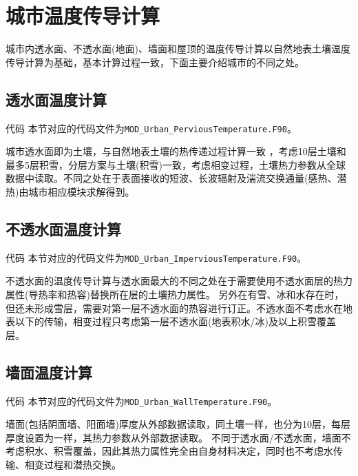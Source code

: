 \section{城市温度传导计算}
城市内透水面、不透水面(地面)、墙面和屋顶的温度传导计算以自然地表土壤温度传导计算为基础，基本计算过程一致，下面主要介绍城市的不同之处。

\subsection{透水面温度计算}
\begin{mymdframed}{代码}
  本节对应的代码文件为\texttt{MOD\_Urban\_PerviousTemperature.F90}。
\end{mymdframed}

城市透水面即为土壤，与自然地表土壤的热传递过程计算一致 ，考虑10层土壤和最多5层积雪，分层方案与土壤(积雪)一致，考虑相变过程，土壤热力参数从全球数据中读取。不同之处在于表面接收的短波、长波辐射及湍流交换通量(感热、潜热)由城市相应模块求解得到。

\subsection{不透水面温度计算}
\begin{mymdframed}{代码}
  本节对应的代码文件为\texttt{MOD\_Urban\_ImperviousTemperature.F90}。
\end{mymdframed}

不透水面的温度传导计算与透水面最大的不同之处在于需要使用不透水面层的热力属性(导热率和热容)替换所在层的土壤热力属性。
另外在有雪、冰和水存在时，但还未形成雪层，需要对第一层不透水面的热容进行订正。不透水面不考虑水在地表以下的传输，相变过程只考虑第一层不透水面(地表积水/冰)及以上积雪覆盖层。

\subsection{墙面温度计算}

\begin{mymdframed}{代码}
  本节对应的代码文件为\texttt{MOD\_Urban\_WallTemperature.F90}。
\end{mymdframed}

墙面(包括阴面墙、阳面墙)厚度从外部数据读取，同土壤一样，也分为10层，每层厚度设置为一样，其热力参数从外部数据读取。
不同于透水面/不透水面，墙面不考虑积水、积雪覆盖，因此其热力属性完全由自身材料决定，同时也不考虑水传输、相变过程和潜热交换。

